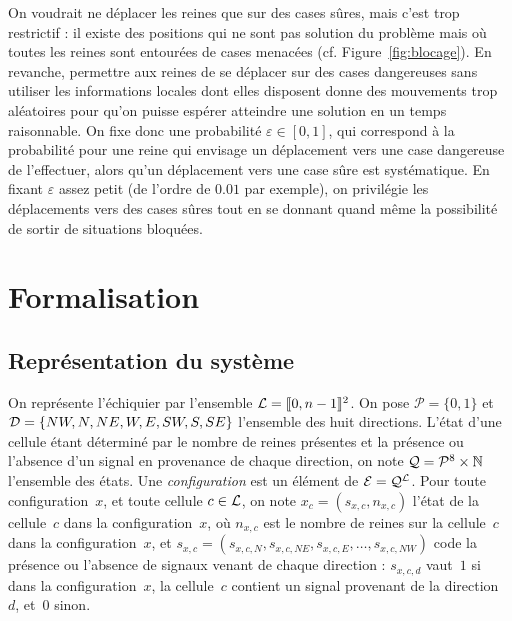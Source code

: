 On voudrait ne déplacer les reines que sur des  cases sûres, mais c'est trop restrictif : il
existe des  positions qui ne  sont pas solution  du problème mais où  toutes les
reines  sont  entourées de  cases  menacées  (cf. Figure~\ref{fig:blocage}).  En
revanche, permettre  aux reines  de se déplacer  sur des cases  dangereuses sans
utiliser les informations locales dont elles disposent donne des mouvements trop
aléatoires  pour  qu'on  puisse  espérer  atteindre une  solution  en  un  temps
raisonnable.  On  fixe  donc   une  probabilité  $\varepsilon  \in  [0,1]$,  qui
correspond à la probabilité pour une  reine qui envisage un déplacement vers une
case dangereuse de  l'effectuer, alors qu'un déplacement vers  une case sûre est
systé\-ma\-tique.  En fixant  $\varepsilon$ assez  petit (de  l'ordre de  $0.01$ par
exemple), on privilégie les déplacements vers des cases sûres tout en se donnant
quand même la possibilité de sortir de situations bloquées.


\section{Formalisation}

\subsection{Représentation du système}

\noindent
On représente l'échiquier par l'ensemble $\mathcal{L} = [\kern-0.15em [ 0, n-1]\kern-0.15em]^2$. On pose
$\mathcal{P} = \{0,1\}$ et \linebreak $\mathcal{D} = \{NW,N,NE,W,E,SW,S,SE\}$ l'ensemble des huit directions. L'état d'une cellule étant déterminé par le nombre de reines présentes et la présence ou l'absence d'un signal en provenance de chaque direction, on note $\mathcal{Q} = {\mathcal{P}^8}\times\mathbb{N}$ l'ensemble des états. Une \emph{configuration} est un élément de $\mathcal{E}=\mathcal{Q}^{\mathcal{L}}$. Pour toute configuration~$x$, et toute cellule $c \in \mathcal{L}$, on note $x_c = (s_{x, c}, n_{x, c})$ l'état de la cellule~$c$ dans la configuration~$x$, où $n_{x,c}$ est le nombre de reines sur la cellule~$c$ dans la configuration~$x$, et $s_{x,c} = (s_{x,c,N}, s_{x,c,NE}, s_{x,c,E}, \ldots, s_{x,c,NW})$ code la présence ou l'absence de signaux venant de chaque direction : $s_{x,c,d}$ vaut~$1$ si dans la configuration~$x$, la cellule~$c$ contient un signal provenant de la direction~$d$, et~$0$ sinon.


